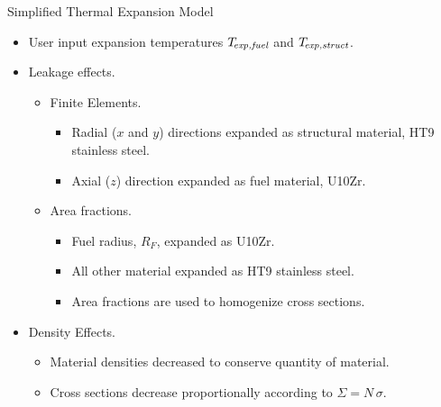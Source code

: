 \begin{frame}{Simplified Thermal Expansion Model}
  \begin{itemize}
    \item User input expansion temperatures ${T_{\!\mbox{\scriptsize \em exp,fuel}}}$ and $T_{\!\mbox{\scriptsize \em exp,struct}}$.
    \item Leakage effects.
      \begin{itemize}
        \item Finite Elements.
          \begin{itemize}
            \item Radial ($x$ and $y$) directions expanded as structural
              material, HT9 stainless steel.
            \item Axial ($z$) direction expanded as fuel material, U10Zr.
          \end{itemize}
        \item Area fractions.
          \begin{itemize}
            \item Fuel radius, $R_F$, expanded as U10Zr.
            \item All other material expanded as HT9 stainless steel.
            \item Area fractions are used to homogenize cross sections.
          \end{itemize}
      \end{itemize}
    \item Density Effects.
      \begin{itemize}
        \item Material densities decreased to conserve quantity of material.
        \item Cross sections decrease proportionally according to $\Sigma = N \,
          \sigma$.
      \end{itemize}
  \end{itemize}
\end{frame}

